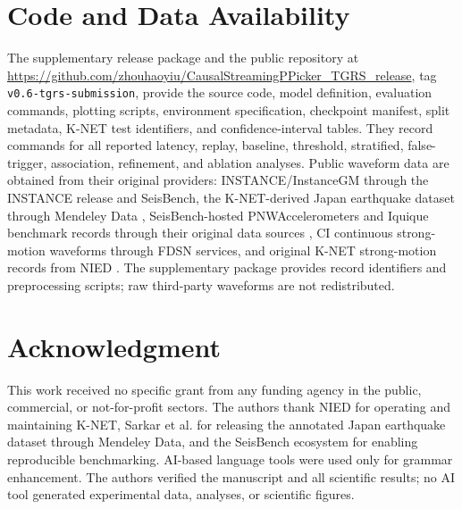 \documentclass[journal]{IEEEtran}
\begin{document}
\section*{Code and Data Availability}
The supplementary release package and the public repository at \url{https://github.com/zhouhaoyiu/CausalStreamingPPicker_TGRS_release}, tag \texttt{v0.6-tgrs-submission}, provide the source code, model definition, evaluation commands, plotting scripts, environment specification, checkpoint manifest, split metadata, K-NET test identifiers, and confidence-interval tables. They record commands for all reported latency, replay, baseline, threshold, stratified, false-trigger, association, refinement, and ablation analyses. Public waveform data are obtained from their original providers: INSTANCE/InstanceGM through the INSTANCE release and SeisBench, the K-NET-derived Japan earthquake dataset through Mendeley Data \cite{sarkar2022japan}, SeisBench-hosted PNWAccelerometers and Iquique benchmark records through their original data sources \cite{woollam2019iquique,woollam2022seisbench}, CI continuous strong-motion waveforms through FDSN services, and original K-NET strong-motion records from NIED \cite{nied2019knet}. The supplementary package provides record identifiers and preprocessing scripts; raw third-party waveforms are not redistributed.

\section*{Acknowledgment}
This work received no specific grant from any funding agency in the public, commercial, or not-for-profit sectors.
The authors thank NIED for operating and maintaining K-NET, Sarkar et al. for releasing the annotated Japan earthquake dataset through Mendeley Data, and the SeisBench ecosystem for enabling reproducible benchmarking.
AI-based language tools were used only for grammar enhancement. The authors verified the manuscript and all scientific results; no AI tool generated experimental data, analyses, or scientific figures.



\end{document}
